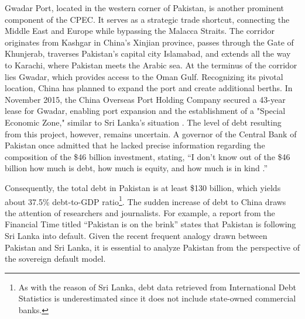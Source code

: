 Gwadar Port, located in the western corner of Pakistan, is another prominent component of the CPEC. It serves as a strategic trade shortcut, connecting the Middle East and Europe while bypassing the Malacca Straits. The corridor originates from Kashgar in China's Xinjian province, passes through the Gate of Khunjerab, traverses Pakistan's capital city Islamabad, and extends all the way to Karachi, where Pakistan meets the Arabic sea. At the terminus of the corridor lies Gwadar, which provides access to the Oman Gulf. Recognizing its pivotal location, China has planned to expand the port and create additional berths. In November 2015, the China Overseas Port Holding Company secured a 43-year lease for Gwadar, enabling port expansion and the establishment of a "Special Economic Zone," similar to Sri Lanka's situation \citep{Ranade-17-CPEC}.
The level of debt resulting from this project, however, remains uncertain. A governor of the Central Bank of Pakistan once admitted that he lacked precise information regarding the composition of the \$46 billion investment, stating, ``I don't know out of the \$46 billion how much is debt, how much is equity, and how much is in kind \citep{small2020returning}.''

Consequently, the total debt in Pakistan is at least \$130 billion, which yields about 37.5\% debt-to-GDP ratio\footnote{
    As with the reason of Sri Lanka, debt data retrieved from International Debt Statistics is underestimated since it does not include state-owned commercial banks.
}.
The sudden increase of debt to China draws the attention of researchers and journalists. For example, a report from the Financial Time titled ``Pakistan is on the brink'' states that Pakistan is following Sri Lanka into default.
Given the recent frequent analogy drawn between Pakistan and Sri Lanka, it is essential to analyze Pakistan from the perspective of the sovereign default model.
